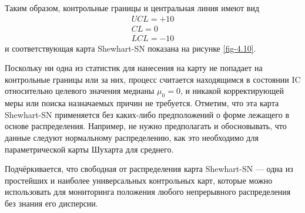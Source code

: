 Таким образом, контрольные границы и центральная линия имеют вид
\[
\begin{gathered}
	UCL = +10 \\
	CL = 0 \\
	LCL = -10
\end{gathered}
\]
и соответствующая карта Shewhart-SN показана на рисунке \ref{fig-4.10}.

Поскольку ни одна из статистик для нанесения на карту не попадает на контрольные границы или за них, процесс считается находящимся в состоянии IC относительно целевого значения медианы \(\mu_0 = 0\), и никакой корректирующей меры или поиска назначаемых причин не требуется. Отметим, что эта карта Shewhart-SN применяется без каких-либо предположений о форме лежащего в основе распределения. Например, не нужно предполагать и обосновывать, что данные следуют нормальному распределению, как это необходимо для параметрической карты Шухарта для среднего.

Подчёркивается, что свободная от распределения карта Shewhart-SN --- одна из простейших и наиболее универсальных контрольных карт, которые можно использовать для мониторинга положения любого непрерывного распределения без знания его дисперсии.


